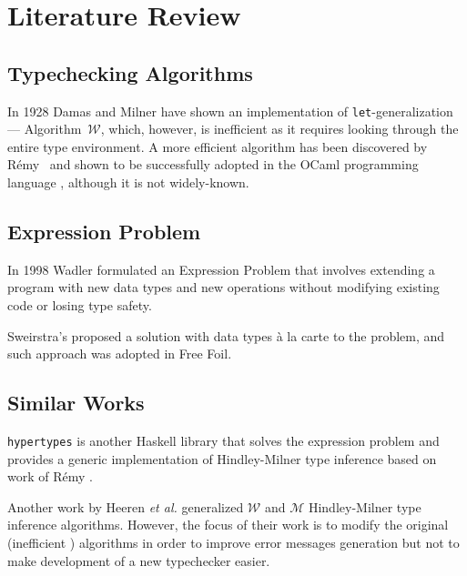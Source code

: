 \chapter{Literature Review}
\label{chap:lr}


\section{Typechecking Algorithms}

In 1928 Damas and Milner \cite{DamasMilner1982_TypeSchemes} have shown an implementation of \texttt{let}-generalization — Algorithm~$\mathcal{W}$, which, however, is inefficient as it requires looking through the entire type environment.
A more efficient algorithm has been discovered by R\'emy~\cite{Remy1992_SortedEqTheoryTypes} and shown to be successfully adopted in the OCaml programming language \cite{Kiselyov2022_OCamplTypeChecker}, although it is not widely-known.

\section{Expression Problem}

In 1998 Wadler formulated an Expression Problem \cite{ExpressionProblem} that involves extending a program with new data types and new operations without modifying existing code or losing type safety.

Sweirstra's proposed a solution with data types à la carte \cite{Swierstra2008_a_la_carte} to the problem, and such approach was adopted in Free Foil.

\section{Similar Works}

\texttt{hypertypes} \cite{hypertypes} is another Haskell library that solves the expression problem and provides a generic implementation of Hindley-Milner type inference based on work of Rémy \cite{Remy1992_SortedEqTheoryTypes}.

Another work by Heeren \textit{et al.} \cite{Heeren2002GeneralizingHindleyMilner} generalized $\mathcal{W}$ and $\mathcal{M}$ Hindley-Milner type inference algorithms. However, the focus of their work is to modify the original (inefficient \cite{Remy1992_SortedEqTheoryTypes}) algorithms in order to improve error messages generation but not to make development of a new typechecker easier.
